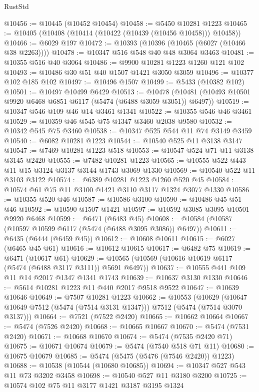 \begin{lexlean}{RustStd}
\begin{coremodule}
@10456 := @10445 (@10452 @10454)
@10458 := @5450 @10281 @1223
@10465 := @10405 (@10408 (@10414 (@10422 (@10439 (@10456 @10458))) @10458))
@10466 := @6029 @197
@10472 := @10393 (@10396 (@10465 (@6027 (@10466 @38 @2263))))
@10478 := @10347 @516 @548 @40 @48 @3064 @3463
@10481 := @10355 @516 @40 @3064
@10486 := @9900 @10281 @1223 @1260 @121 @102
@10493 := @10486 @30 @51 @40 @1507 @1421 @3050 @3059
@10496 := @10377 @102 @185 @102
@10497 := @10496 @1507
@10499 := @5433 (@10382 @102)
@10501 := @10497 @10499 @6429
@10513 := @10478 (@10481 (@10493 @10501 @9920 @6468 @6851 @6117 (@5474 (@6488 @3059 @3051)) @6497))
@10519 := @10347 @546 @109 @46 @14 @3461 @1341
@10522 := @10355 @546 @46 @3461
@10529 := @10359 @46 @545 @75 @1347 @3460 @2038 @9580
@10532 := @10342 @545 @75 @3460
@10538 := @10347 @525 @544 @11 @74 @3149 @3459
@10540 := @6082 @10281 @1223
@10544 := @10540 @525 @11 @3138 @3147
@10547 := @7469 @10281 @1223 @518
@10553 := @10547 @524 @71 @11 @3138 @3145 @2420
@10555 := @7482 @10281 @1223
@10565 := @10555 @522 @443 @11 @15 @3124 @3137 @3144 @1743 @3069 @1330
@10569 := @10540 @522 @11 @3103 @3122
@10574 := @6389 @10281 @1223 @1260 @520 @45
@10584 := @10574 @61 @75 @11 @3100 @1421 @3110 @3117 @1324 @3077 @1330
@10586 := @10355 @520 @46
@10587 := @10586 @3100
@10590 := @10486 @45 @51 @46
@10592 := @10590 @1507 @1421
@10597 := @10592 @3085 @3095 @10501 @9920 @6468
@10599 := @6471 (@6483 @45)
@10608 := @10584 (@10587 (@10597 @10599 @6117 (@5474 (@6488 @3095 @3086)) @6497))
@10611 := @6435 (@6444 (@6459 @45))
@10612 := @10608 @10611
@10615 := @6027 (@6465 @45 @61)
@10616 := @10612 @10615
@10617 := @6482 @75
@10619 := @6471 (@10617 @61)
@10629 := @10565 (@10569 (@10616 @10619 @6117 (@5474 (@6488 @3117 @3111)) @5691 @6497))
@10637 := @10555 @441 @109 @11 @14 @2017 @1347 @1341 @1743
@10639 := @10637 @3130 @1330
@10646 := @5614 @10281 @1223 @11 @440 @2017 @9518 @9522
@10647 := @10639 @10646
@10649 := @7507 @10281 @1223
@10662 := @10553
    (@10629 (@10647 @10649 @7512 (@5474 (@7514 @3131 @1347))) @7512 (@5474 (@7514 @3070 @3137)))
@10664 := @7521 (@7522 @2420)
@10665 := @10662 @10664
@10667 := @5474 (@7526 @2420)
@10668 := @10665 @10667
@10670 := @5474 (@7531 @2420)
@10671 := @10668 @10670
@10674 := @5474 (@7535 @2420 @71)
@10675 := @10671 @10674
@10679 := @5474 (@7540 @518 @71 @11)
@10680 := @10675 @10679
@10685 := @5474 (@5475 (@5476 (@7546 @2420)) @1223)
@10688 := @10538 (@10544 (@10680 @10685))
@10694 := @10347 @527 @543 @11 @73 @3202 @3458
@10698 := @10540 @527 @11 @3180 @3200
@10725 := @10574
    @102
    @75
    @11
    @3177
    @1421
    @3187
    @3195
    @1324

\end{coremodule}
\end{lexlean}
